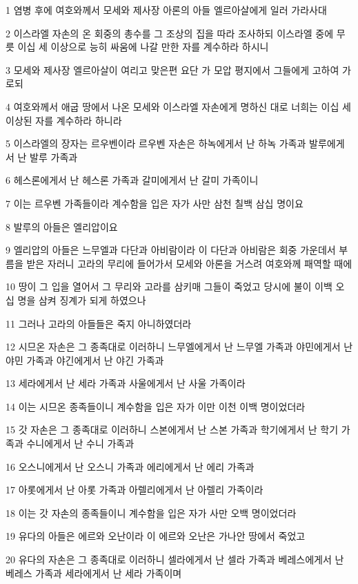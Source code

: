 \par 1 염병 후에 여호와께서 모세와 제사장 아론의 아들 엘르아살에게 일러 가라사대
\par 2 이스라엘 자손의 온 회중의 총수를 그 조상의 집을 따라 조사하되 이스라엘 중에 무릇 이십 세 이상으로 능히 싸움에 나갈 만한 자를 계수하라 하시니
\par 3 모세와 제사장 엘르아살이 여리고 맞은편 요단 가 모압 평지에서 그들에게 고하여 가로되
\par 4 여호와께서 애굽 땅에서 나온 모세와 이스라엘 자손에게 명하신 대로 너희는 이십 세 이상된 자를 계수하라 하니라
\par 5 이스라엘의 장자는 르우벤이라 르우벤 자손은 하녹에게서 난 하녹 가족과 발루에게서 난 발루 가족과
\par 6 헤스론에게서 난 헤스론 가족과 갈미에게서 난 갈미 가족이니
\par 7 이는 르우벤 가족들이라 계수함을 입은 자가 사만 삼천 칠백 삼십 명이요
\par 8 발루의 아들은 엘리압이요
\par 9 엘리압의 아들은 느무엘과 다단과 아비람이라 이 다단과 아비람은 회중 가운데서 부름을 받은 자러니 고라의 무리에 들어가서 모세와 아론을 거스려 여호와께 패역할 때에
\par 10 땅이 그 입을 열어서 그 무리와 고라를 삼키매 그들이 죽었고 당시에 불이 이백 오십 명을 삼켜 징계가 되게 하였으나
\par 11 그러나 고라의 아들들은 죽지 아니하였더라
\par 12 시므온 자손은 그 종족대로 이러하니 느무엘에게서 난 느무엘 가족과 야민에게서 난 야민 가족과 야긴에게서 난 야긴 가족과
\par 13 세라에게서 난 세라 가족과 사울에게서 난 사울 가족이라
\par 14 이는 시므온 종족들이니 계수함을 입은 자가 이만 이천 이백 명이었더라
\par 15 갓 자손은 그 종족대로 이러하니 스본에게서 난 스본 가족과 학기에게서 난 학기 가족과 수니에게서 난 수니 가족과
\par 16 오스니에게서 난 오스니 가족과 에리에게서 난 에리 가족과
\par 17 아롯에게서 난 아롯 가족과 아렐리에게서 난 아렐리 가족이라
\par 18 이는 갓 자손의 종족들이니 계수함을 입은 자가 사만 오백 명이었더라
\par 19 유다의 아들은 에르와 오난이라 이 에르와 오난은 가나안 땅에서 죽었고
\par 20 유다의 자손은 그 종족대로 이러하니 셀라에게서 난 셀라 가족과 베레스에게서 난 베레스 가족과 세라에게서 난 세라 가족이며
